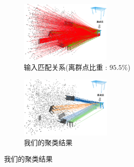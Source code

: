 \begin{figure}[ht]
        \centering
        \begin{subfigure}{0.4\textwidth}
            \centering
            \includegraphics[height=3cm]{images/multi-input-corrs.png}
              \caption{输入匹配关系(离群点比重 : $95.5\%$) }
              \label{fig:multi-corrs}
          \end{subfigure}
          \begin{subfigure}{0.45\textwidth}
            \centering
            \includegraphics[height=3cm]{images/multi-cluster-corrs.png}
              \caption{我们的聚类结果}
              \label{fig:multi-cluster-corrs}
          \end{subfigure}
      

\end{figure}
